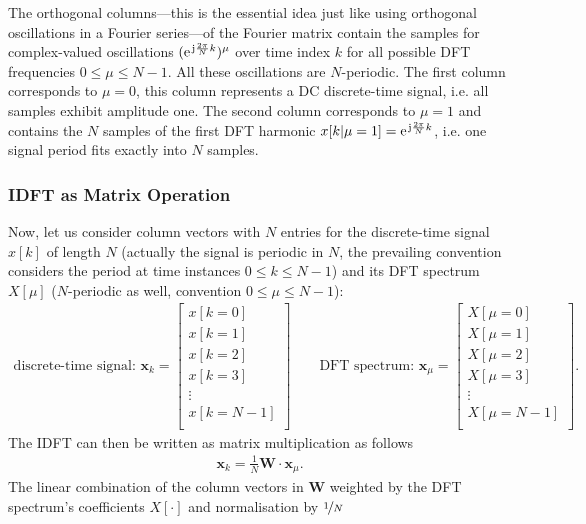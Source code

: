 \documentclass[11pt,a4paper,DIV=12]{scrartcl}
\begin{document}
%
The orthogonal columns---this is the essential idea just like using
orthogonal oscillations in a Fourier series---of the Fourier matrix contain
the samples for complex-valued
oscillations $(\e^{\im \frac{2\pi}{N} k})^\mu$ over time index $k$ for all possible
DFT frequencies $0 \leq \mu \leq N-1$.
%
All these oscillations are $N$-periodic.
%
The first column corresponds to $\mu=0$, this column represents a DC discrete-time
signal, i.e. all samples exhibit amplitude one.
%
The second column corresponds to $\mu=1$ and contains the $N$ samples of the
first DFT harmonic $x[k|\mu=1]=\e^{\im \frac{2\pi}{N} k}$,
i.e. one signal period fits exactly into $N$ samples.
%
\subsubsection{IDFT as Matrix Operation}
%
Now, let us consider column vectors with $N$ entries
for the discrete-time signal $x[k]$ of length $N$
(actually the signal is periodic in $N$,
the prevailing convention considers the period at time instances
$0 \leq k \leq N-1$)
and its DFT spectrum $X[\mu]$ ($N$-periodic as well,
convention $0\leq \mu \leq N-1$):
%
\begin{align}
\text{discrete-time signal: }
\bm{x}_k =
\begin{bmatrix}
x[k=0]\\
x[k=1]\\
x[k=2]\\
x[k=3]\\
\vdots\\
x[k=N-1]\\
\end{bmatrix}\qquad
\text{DFT spectrum: }
\bm{x}_\mu =
\begin{bmatrix}
X[\mu=0]\\
X[\mu=1]\\
X[\mu=2]\\
X[\mu=3]\\
\vdots\\
X[\mu=N-1]\\
\end{bmatrix}.
\end{align}
%
The IDFT can then be written as matrix multiplication as follows
%
\begin{align}
\label{eq:IDFT_as_Matrix}
\bm{x}_k = \frac{1}{N} \bm{W} \cdot \bm{x}_\mu .
\end{align}
%
The linear combination of the column vectors in $\bm{W}$ weighted by the DFT
spectrum's coefficients $X[\cdot]$ and normalisation by $\nicefrac{1}{N}$
\end{document}
